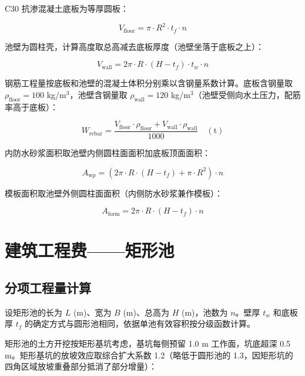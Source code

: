\documentclass[12pt,a4paper]{ctexart}
\begin{document}
C30 抗渗混凝土底板为等厚圆板：

\begin{equation}
V_{\text{floor}} = \pi \cdot R^2 \cdot t_f \cdot n
\end{equation}

池壁为圆柱壳，计算高度取总高减去底板厚度（池壁坐落于底板之上）：

\begin{equation}
V_{\text{wall}} = 2\pi \cdot R \cdot (H - t_f) \cdot t_w \cdot n
\end{equation}

钢筋工程量按底板和池壁的混凝土体积分别乘以含钢量系数计算。底板含钢量取 $\rho_{\text{floor}} = 100$ kg/m$^3$，池壁含钢量取 $\rho_{\text{wall}} = 120$ kg/m$^3$（池壁受侧向水土压力，配筋率高于底板）：

\begin{equation}
W_{\text{rebar}} = \frac{V_{\text{floor}} \cdot \rho_{\text{floor}} + V_{\text{wall}} \cdot \rho_{\text{wall}}}{1000} \quad (\text{t})
\end{equation}

内防水砂浆面积取池壁内侧圆柱面面积加底板顶面面积：

\begin{equation}
A_{\text{wp}} = \left(2\pi \cdot R \cdot (H - t_f) + \pi \cdot R^2\right) \cdot n
\end{equation}

模板面积取池壁外侧圆柱面面积（内侧防水砂浆兼作模板）：

\begin{equation}
A_{\text{form}} = 2\pi \cdot R \cdot (H - t_f) \cdot n
\end{equation}

\section{建筑工程费——矩形池}

\subsection{分项工程量计算}

设矩形池的长为 $L$ (m)、宽为 $B$ (m)、总高为 $H$ (m)，池数为 $n$。壁厚 $t_w$ 和底板厚 $t_f$ 的确定方式与圆形池相同，依据单池有效容积按分级函数计算。

矩形池的土方开挖按矩形基坑考虑，基坑每侧预留 1.0 m 工作面，坑底超深 0.5 m。矩形基坑的放坡效应取综合扩大系数 1.2（略低于圆形池的 1.3，因矩形坑的四角区域放坡重叠部分抵消了部分增量）：
\end{document}
